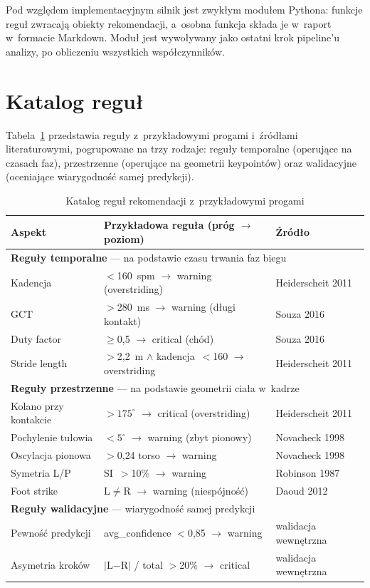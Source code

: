 Pod względem implementacyjnym silnik jest zwykłym modułem Pythona: funkcje reguł zwracają obiekty rekomendacji, a~osobna funkcja składa je w~raport w~formacie Markdown. Moduł jest wywoływany jako ostatni krok pipeline'u analizy, po obliczeniu wszystkich współczynników.

\section{Katalog reguł}
\label{sec:rules-categories}

Tabela~\ref{tab:rules} przedstawia reguły z~przykładowymi progami i~źródłami literaturowymi, pogrupowane na trzy rodzaje: reguły temporalne (operujące na czasach faz), przestrzenne (operujące na geometrii keypointów) oraz walidacyjne (oceniające wiarygodność samej predykcji).

\begin{table}[htbp]
\centering
\caption{Katalog reguł rekomendacji z~przykładowymi progami}
\label{tab:rules}
\small
\begin{tabular}{p{3.2cm}p{5.5cm}p{3.8cm}}
\hline
\textbf{Aspekt} & \textbf{Przykładowa reguła (próg $\to$ poziom)} & \textbf{Źródło} \\
\hline
\multicolumn{3}{l}{\textbf{Reguły temporalne} --- na podstawie czasu trwania faz biegu} \\
Kadencja           & $<$160~spm $\to$ warning (overstriding) & Heiderscheit 2011 \\
GCT                & $>$280~ms $\to$ warning (długi kontakt) & Souza 2016 \\
Duty factor        & $\geq$0{,}5 $\to$ critical (chód)       & Souza 2016 \\
Stride length      & $>$2{,}2~m $\wedge$ kadencja~$<$160 $\to$ overstriding & Heiderscheit 2011 \\
\hline
\multicolumn{3}{l}{\textbf{Reguły przestrzenne} --- na podstawie geometrii ciała w~kadrze} \\
Kolano przy kontakcie & $>175^\circ$ $\to$ critical (overstriding)   & Heiderscheit 2011 \\
Pochylenie tułowia & $<5^\circ$ $\to$ warning (zbyt pionowy)      & Novacheck 1998 \\
Oscylacja pionowa  & $>$0{,}24 torso $\to$ warning           & Novacheck 1998 \\
Symetria L/P       & SI~$>$10\% $\to$ warning                & Robinson 1987 \\
Foot strike        & L$\neq$R $\to$ warning (niespójność)    & Daoud 2012 \\
\hline
\multicolumn{3}{l}{\textbf{Reguły walidacyjne} --- wiarygodność samej predykcji} \\
Pewność predykcji  & avg\_confidence $<$0{,}85 $\to$ warning & walidacja wewnętrzna \\
Asymetria kroków   & $|$L$-$R$|$ / total $>$20\% $\to$ critical & walidacja wewnętrzna \\
\hline
\end{tabular}
\end{table}


